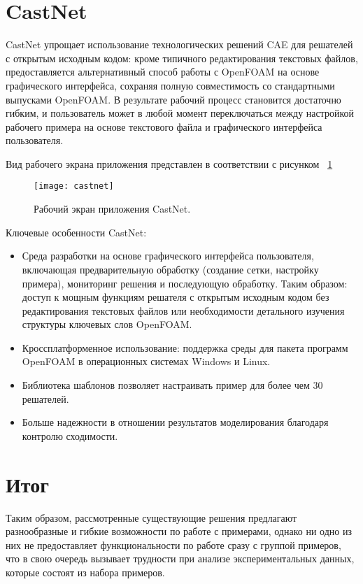 \documentclass[14pt]{extreport}
\begin{document}
\section{CastNet}

CastNet упрощает использование технологических решений CAE для решателей с открытым исходным кодом: кроме типичного редактирования текстовых файлов, предоставляется альтернативный способ работы с OpenFOAM на основе графического интерфейса, сохраняя полную совместимость со стандартными выпусками OpenFOAM. В результате рабочий процесс становится достаточно гибким, и пользователь может в любой момент переключаться между настройкой рабочего примера на основе текстового файла и графического интерфейса пользователя.

Вид рабочего экрана приложения представлен в соответствии с рисунком ~\ref{fig4}
\begin{figure}[H]
\centerline{\texttt{[image: castnet]}}
\caption{Рабочий экран приложения CastNet.}
\label{fig4}
\end{figure}

Ключевые особенности CastNet:
\begin{itemize}
\item Среда разработки на основе графического интерфейса пользователя, включающая предварительную обработку (создание сетки, настройку примера), мониторинг решения и последующую обработку. Таким образом: доступ к мощным функциям решателя с открытым исходным кодом без редактирования текстовых файлов или необходимости детального изучения структуры ключевых слов OpenFOAM.
\item Кроссплатформенное использование: поддержка среды для пакета программ OpenFOAM в операционных системах Windows и Linux.
\item Библиотека шаблонов позволяет настраивать пример для более чем 30 решателей.
\item Больше надежности в отношении результатов моделирования благодаря контролю сходимости.
\end{itemize}

\section{Итог}

Таким образом, рассмотренные существующие решения предлагают разнообразные и гибкие возможности по работе с примерами, однако ни одно из них не предоставляет функциональности по работе сразу с группой примеров, что в свою очередь вызывает трудности при анализе экспериментальных данных, которые состоят из набора примеров.  
\end{document}
